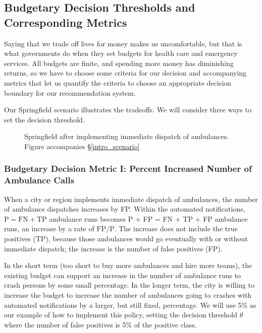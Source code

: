\subsection{Budgetary Decision Thresholds and Corresponding Metrics}
\label{political_decisions}

Saying that we trade off lives for money makes us uncomfortable, but that is what governments do when they set budgets for health care and emergency services.  All budgets are finite, and spending more money has diminishing returns, so we have to choose some criteria for our decision and accompanying metrics that let us quantify the criteria to choose an appropriate decision boundary for our recommendation system.  

Our Springfield scenario illustrates the tradeoffs.  We will consider three ways to set the decision threshold.  

\begin{figure}[h]
	
\caption{\normalfont\normalsize Springfield after implementing immediate dispatch of ambulances.  Figure accompanies \S\ref{intro_scenario}}
\label{methods_springfield_after}
\end{figure}

\FloatBarrier




\subsubsection{Budgetary Decision Metric I:  Percent Increased Number of Ambulance Calls}
\label{political_decisions_percent_increased}

When a city or region implements immediate dispatch of ambulances, the number of ambulance dispatches increases by FP.   Within the automated notifications, 
$\text{P} = \text{FN} + \text{TP}$
 ambulance runs becomes P + FP = FN + TP + FP ambulance runs, an increase by a rate of $\text{FP}/\text{P}$.  The increase does not include the true positives (TP), because those ambulances would go eventually with or without immediate dispatch; the increase is the number of false positives (FP).  
 
In the short term (too short to buy more ambulances and hire more teams), the existing budget can support an increase in the number of ambulance runs to crash persons by some small percentage.  In the longer term, the city is willing to increase the budget to increase the number of ambulances going to crashes with automated notifications by a larger, but still fixed, percentage.  We will use 5\% as our example of how to implement this policy, setting the decision threshold $\theta$ where the number of false positives is 5\% of the positive class.  

